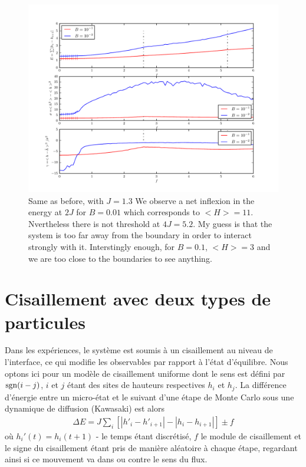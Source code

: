 \begin{figure}
	\includegraphics[width=\linewidth]{./sosequi-laser/j13.pdf}
	\caption{Same as before, with $J=1.3$ We observe a net inflexion in the energy at $2 J$ for  $B=0.01$ which corresponds to $<H>=11$. Nvertheless there is not threshold at $4 J = 5.2$. My guess is that the system is too far away from the boundary in order to interact strongly with it. Interstingly enough, for $B=0.1$, $<H>=3$ and we are too close to the boundaries to see anything.}
\end{figure}


\section{Cisaillement avec deux types de particules}


Dans les expériences, le système est soumis à un cisaillement au niveau de l'interface, ce qui modifie les observables par rapport à l'état d'équilibre. Nous optons ici pour un modèle de cisaillement uniforme dont le sens est défini par $\operatorname{sgn}(i-j)$, $i$ et $j$ étant des sites de hauteurs respectives $h_i$ et $h_j$. 
La différence d'énergie entre un micro-état et le suivant d'une étape de Monte Carlo sous une dynamique de diffusion (Kawasaki) est alors
\begin{align}
	\Delta E = J \sum_i \left[ |h'_i-h'_{i+1}|-|h_i-h_{i+1}| \right] \pm f 
\end{align}
où $h_i'(t) = h_i(t+1)$ - le temps étant discrétisé, $f$ le module de cisaillement et le signe du cisaillement étant pris de manière aléatoire à chaque étape, regardant ainsi si ce mouvement va dans ou contre le sens du flux. 


